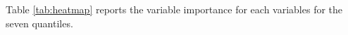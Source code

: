 

Table \ref{tab:heatmap} reports the variable importance for each variables for the seven quantiles.

